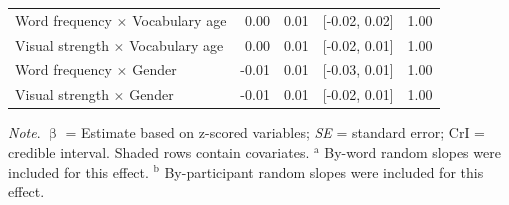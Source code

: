 \documentclass[
  12pt,
  man,floatsintext]{apa7}
\begin{document}
\begin{table}[H]
\begin{threeparttable}
\begin{tabular}[t]{lrrrr}
\hspace{1em}Word frequency  $\times$  Vocabulary age & 0.00 & 0.01 & {}[-0.02, 0.02] & 1.00\\
\hspace{1em}Visual strength  $\times$  Vocabulary age & 0.00 & 0.01 & {}[-0.02, 0.01] & 1.00\\
\hspace{1em}Word frequency  $\times$  Gender & -0.01 & 0.01 & {}[-0.03, 0.01] & 1.00\\
\hspace{1em}Visual strength  $\times$  Gender & -0.01 & 0.01 & {}[-0.02, 0.01] & 1.00\\
\bottomrule
\end{tabular}
\begin{tablenotes}
\item \textit{\linebreak} 
\item \textit{Note}. $\upbeta$ = Estimate based on z-scored variables; \textit{SE} = standard error; \linebreak \phantom{.}CrI = credible interval. Shaded rows contain covariates. \linebreak \linebreak \phantom{.}$^{\text{a}}$ By-word random slopes were included for this effect. \linebreak \phantom{.}$^{\text{b}}$ By-participant random slopes were included for this effect.
\end{tablenotes}
\end{threeparttable}
\end{table}
\end{document}
